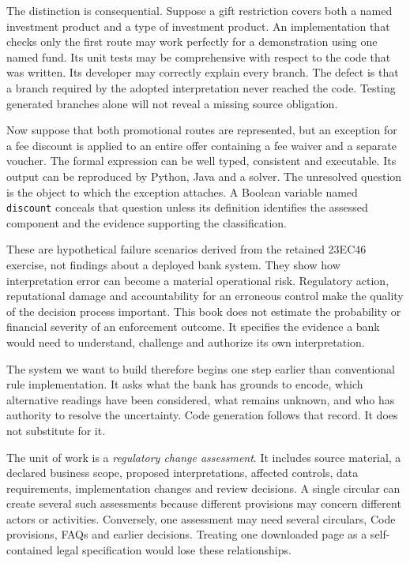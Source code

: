 \documentclass[12pt,a4paper,oneside,openany]{book}
\begin{document}
The distinction is consequential. Suppose a gift restriction covers both a
named investment product and a type of investment product. An implementation
that checks only the first route may work perfectly for a demonstration using
one named fund. Its unit tests may be comprehensive with respect to the code
that was written. Its developer may correctly explain every branch. The defect
is that a branch required by the adopted interpretation never reached the code.
Testing generated branches alone will not reveal a missing source obligation.

Now suppose that both promotional routes are represented, but an exception for
a fee discount is applied to an entire offer containing a fee waiver and a
separate voucher. The formal expression can be well typed, consistent and
executable. Its output can be reproduced by Python, Java and a solver. The
unresolved question is the object to which the exception attaches. A Boolean
variable named \texttt{discount} conceals that question unless its definition
identifies the assessed component and the evidence supporting the classification.

These are hypothetical failure scenarios derived from the retained 23EC46
exercise, not findings about a deployed bank system. They show how interpretation error can become a material operational risk. Regulatory action,
reputational damage and accountability for an erroneous control make the quality
of the decision process important. This book does not estimate the probability
or financial severity of an enforcement outcome. It specifies the evidence a
bank would need to understand, challenge and authorize its own interpretation.

The system we want to build therefore begins one step earlier than conventional
rule implementation. It asks what the bank has grounds to encode, which
alternative readings have been considered, what remains unknown, and who has
authority to resolve the uncertainty. Code generation follows that record. It
does not substitute for it.

The unit of work is a \emph{regulatory change assessment}. It includes source
material, a declared business scope, proposed interpretations, affected controls,
data requirements, implementation changes and review decisions. A single
circular can create several such assessments because different provisions may
concern different actors or activities. Conversely, one assessment may need
several circulars, Code provisions, FAQs and earlier decisions. Treating one
downloaded page as a self-contained legal specification would lose these
relationships.
\end{document}
